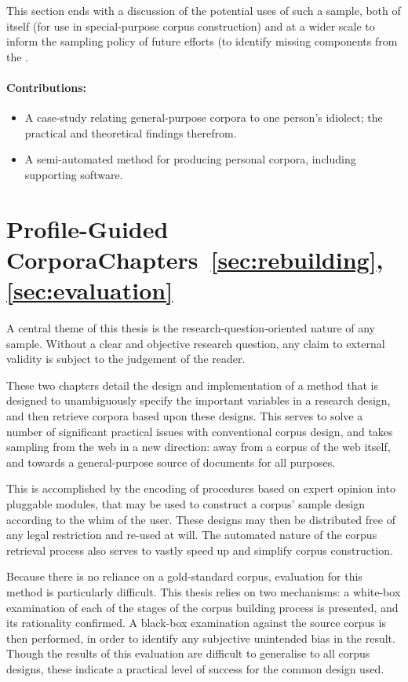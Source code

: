 This section ends with a discussion of the potential uses of such a sample, both of itself (for use in special-purpose corpus construction) and at a wider scale to inform the sampling policy of future efforts (to identify missing components from the .

\paragraph{Contributions:}
\begin{itemize}
    \item A case-study relating general-purpose corpora to one person's idiolect; the practical and theoretical findings therefrom.
    \item A semi-automated method for producing personal corpora, including supporting software.
\end{itemize}


\section*{Profile-Guided Corpora\hfill{}Chapters~\ref{sec:rebuilding},~\ref{sec:evaluation}}
A central theme of this thesis is the research-question-oriented nature of any sample.  Without a clear and objective research question, any claim to external validity is subject to the judgement of the reader.

These two chapters detail the design and implementation of a method that is designed to unambiguously specify the important variables in a research design, and then retrieve corpora based upon these designs.  This serves to solve a number of significant practical issues with conventional corpus design, and takes sampling from the web in a new direction: away from a corpus of the web itself, and towards a general-purpose source of documents for all purposes.

This is accomplished by the encoding of procedures based on expert opinion into pluggable modules, that may be used to construct a corpus' sample design according to the whim of the user.  These designs may then be distributed free of any legal restriction and re-used at will.  The automated nature of the corpus retrieval process also serves to vastly speed up and simplify corpus construction.

Because there is no reliance on a gold-standard corpus, evaluation for this method is particularly difficult.  This thesis relies on two mechanisms: a white-box examination of each of the stages of the corpus building process is presented, and its rationality confirmed.  A black-box examination against the source corpus is then performed, in order to identify any subjective unintended bias in the result.  Though the results of this evaluation are difficult to generalise to all corpus designs, these indicate a practical level of success for the common design used.

